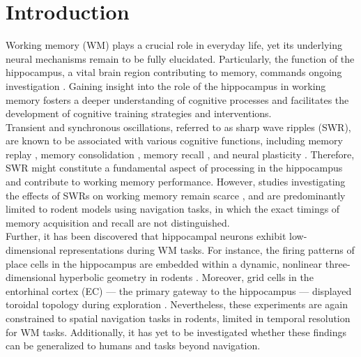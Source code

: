 \documentclass[final,3p,times,twocolumn]{elsarticle}
\begin{document}
\section{Introduction}
Working memory (WM) plays a crucial role in everyday life, yet its underlying neural mechanisms remain to be fully elucidated. Particularly, the function of the hippocampus, a vital brain region contributing to memory, commands ongoing investigation \cite{scoville_loss_1957,squire_legacy_2009,boran_persistent_2019,kaminski_persistently_2017,kornblith_persistent_2017,faraut_dataset_2018,borders_hippocampus_2022,li_functional_2023,dimakopoulos_information_2022}. Gaining insight into the role of the hippocampus in working memory fosters a deeper understanding of cognitive processes and facilitates the development of cognitive training strategies and interventions.
\\
\indent
Transient and synchronous oscillations, referred to as sharp wave ripples (SWR), are known to be associated with various cognitive functions, including memory replay \cite{wilson_reactivation_1994,nadasdy_replay_1999,lee_memory_2002,davidson_hippocampal_2009}, memory consolidation \cite{girardeau_selective_2009,ego-stengel_disruption_2010,fernandez-ruiz_long-duration_2019,kim_corticalhippocampal_2022}, memory recall \cite{wu_hippocampal_2017,norman_hippocampal_2019,norman_hippocampal_2021}, and neural plasticity \cite{behrens_induction_2005,norimoto_hippocampal_2018}. Therefore, SWR might constitute a fundamental aspect of processing in the hippocampus and contribute to working memory performance. However, studies investigating the effects of SWRs on working memory remain scarce \cite{jadhav_awake_2012}, and are predominantly limited to rodent models using navigation tasks, in which the exact timings of memory acquisition and recall are not distinguished.
\\
\indent
Further, it has been discovered that hippocampal neurons exhibit low-dimensional representations during WM tasks. For instance, the firing patterns of place cells \cite{okeefe_hippocampus_1971,okeefe_place_1976,ekstrom_cellular_2003,kjelstrup_finite_2008,harvey_intracellular_2009,royer_control_2012} in the hippocampus are embedded within a dynamic, nonlinear three-dimensional hyperbolic geometry in rodents \cite{zhang_hippocampal_2022}. Moreover, grid cells in the entorhinal cortex (EC) --- the primary gateway to the hippocampus \cite{naber_reciprocal_2001,van_strien_anatomy_2009,strange_functional_2014} --- displayed toroidal topology during exploration \cite{gardner_toroidal_2022}. Nevertheless, these experiments are again constrained to spatial navigation tasks in rodents, limited in temporal resolution for WM tasks. Additionally, it has yet to be investigated whether these findings can be generalized to humans and tasks beyond navigation.
\end{document}
